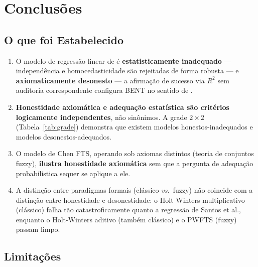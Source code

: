 \documentclass[
    12pt,
    oneside,
    openany,
    a4paper,
    english,
    brazil
]{abntex2}
\theoremstyle{definition}
\begin{document}
\chapter{Conclusões}
\label{cap:conclusoes}

\section{O que foi Estabelecido}
\label{sec:estabelecido}

\begin{enumerate}[label=(\alph*)]
    \item O modelo de regressão linear de  é \textbf{estatisticamente inadequado} --- independência e homocedasticidade são rejeitadas de forma robusta --- e \textbf{axiomaticamente desonesto} --- a afirmação de sucesso via $R^2$ sem auditoria correspondente configura BENT no sentido de .

    \item \textbf{Honestidade axiomática e adequação estatística são critérios logicamente independentes}, não sinônimos. A grade $2 \times 2$ (Tabela~\ref{tab:grade}) demonstra que existem modelos honestos-inadequados e modelos desonestos-adequados.

    \item O modelo de Chen FTS, operando sob axiomas distintos (teoria de conjuntos fuzzy), \textbf{ilustra honestidade axiomática} sem que a pergunta de adequação probabilística sequer se aplique a ele.

    \item A distinção entre paradigmas formais (clássico \textit{vs.}\ fuzzy) não coincide com a distinção entre honestidade e desonestidade: o Holt-Winters multiplicativo (clássico) falha tão catastroficamente quanto a regressão de Santos et al., enquanto o Holt-Winters aditivo (também clássico) e o PWFTS (fuzzy) passam limpo.
\end{enumerate}

\section{Limitações}
\label{sec:limitacoes}
\end{document}
